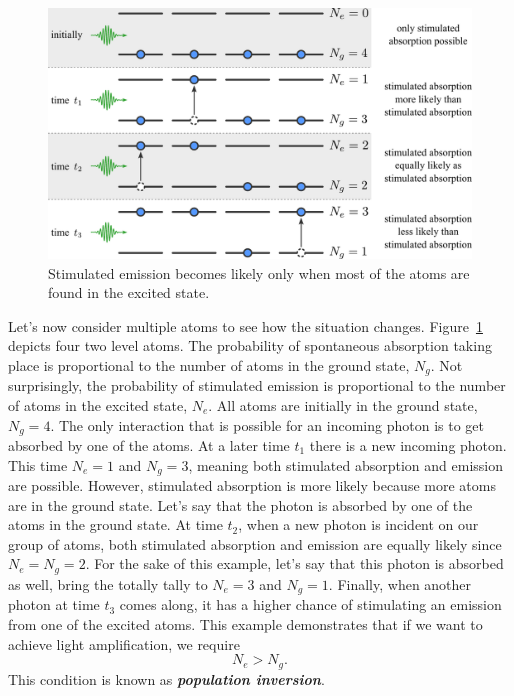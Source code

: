 \begin{figure}[t]
    \centering
    \includegraphics[width=\textwidth]{lesson5/5-3_population_inversion.pdf}
    \caption[Population inversion]{Stimulated emission becomes likely only when most of the atoms are found in the excited state.}
    \label{fig:5-3_population_inversion}
\end{figure}

Let's now consider multiple atoms to see how the situation changes.
Figure~\ref{fig:5-3_population_inversion} depicts four two level atoms.
The probability of spontaneous absorption taking place is proportional to the number of atoms in the ground state, $N_g$.
Not surprisingly, the probability of stimulated emission is proportional to the number of atoms in the excited state, $N_e$.
All atoms are initially in the ground state, $N_g=4$.
The only interaction that is possible for an incoming photon is to get absorbed by one of the atoms.
At a later time $t_1$ there is a new incoming photon.
This time $N_e=1$ and $N_g=3$, meaning both stimulated absorption and emission are possible.
However, stimulated absorption is more likely because more atoms are in the ground state.
Let's say that the photon is absorbed by one of the atoms in the ground state.
At time $t_2$, when a new photon is incident on our group of atoms, both stimulated absorption and emission are equally likely since $N_e=N_g=2$.
For the sake of this example, let's say that this photon is absorbed as well, bring the totally tally to $N_e=3$ and $N_g=1$.
Finally, when another photon at time $t_3$ comes along, it has a higher chance of stimulating an emission from one of the excited atoms.
This example demonstrates that if we want to achieve light amplification, we require
\begin{equation}
    N_e > N_g.
\end{equation}
This condition is known as \textit{\textbf{population inversion}}.

